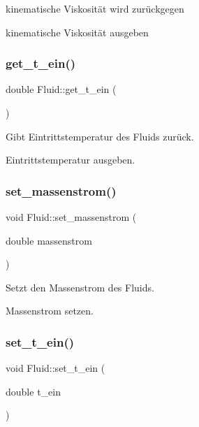 kinematische Viskosität wird zurückgegen 

kinematische Viskosität ausgeben \mbox{\label{class_fluid_a60d0c9269a8c8af00bf8828c7f764537}} 
\subsubsection{\texorpdfstring{get\+\_\+t\+\_\+ein()}{get\_t\_ein()}}
{\footnotesize\ttfamily double Fluid\+::get\+\_\+t\+\_\+ein (\begin{DoxyParamCaption}{ }\end{DoxyParamCaption})}



Gibt Eintrittstemperatur des Fluids zurück. 

Eintrittstemperatur ausgeben. \mbox{\label{class_fluid_af70884f77d5dd43499fcc70969100498}} 
\subsubsection{\texorpdfstring{set\+\_\+massenstrom()}{set\_massenstrom()}}
{\footnotesize\ttfamily void Fluid\+::set\+\_\+massenstrom (\begin{DoxyParamCaption}\item[{double}]{massenstrom }\end{DoxyParamCaption})}



Setzt den Massenstrom des Fluids. 

Massenstrom setzen. \mbox{\label{class_fluid_a9449846d8fd4bf31d8685eefa55d4a57}} 
\subsubsection{\texorpdfstring{set\+\_\+t\+\_\+ein()}{set\_t\_ein()}}
{\footnotesize\ttfamily void Fluid\+::set\+\_\+t\+\_\+ein (\begin{DoxyParamCaption}\item[{double}]{t\+\_\+ein }\end{DoxyParamCaption})}



